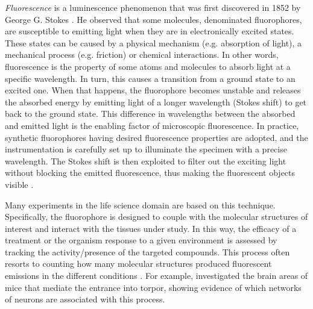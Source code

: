 \emph{Fluorescence} is a luminescence phenomenon that was first discovered in 1852 by George G. Stokes \cite{stokes2010memoir}. 
He observed that some molecules, denominated fluorophores, are susceptible to emitting light when they are in electronically excited states. These states can be caused by a physical mechanism (e.g. absorption of light), a mechanical process (e.g. friction) or chemical interactions.
In other words, fluorescence is the property of some atoms and molecules to absorb light at a specific wavelength. In turn, this causes a transition from a ground state to an excited one. When that happens, the fluorophore becomes unstable and releases the absorbed energy by emitting light of a longer wavelength (Stokes shift) to get back to the ground state.
This difference in wavelengths between the absorbed and emitted light is the enabling factor of microscopic fluorescence. 
In practice, synthetic fluorophores having desired fluorescence properties are adopted, and the 
instrumentation is carefully set up to illuminate the specimen with a precise wavelength. The Stokes shift is then exploited to filter out the exciting light without blocking the emitted fluorescence, thus making the fluorescent objects visible \cite{lichtman2005fluorescence}.

Many experiments in the life science domain are based on this technique.
Specifically, the fluorophore is designed to couple with the molecular structures of interest and interact with the tissues under study. 
In this way, the efficacy of a treatment or the organism response to a given environment is assessed by tracking the activity/presence of the targeted compounds. 
This process often resorts to counting how many molecular structures produced fluorescent emissions in the different conditions \cite{hitrec2019neural, hitrec2021reversible, da2020median}.
For example,  investigated the brain areas of mice that mediate the entrance into torpor, showing evidence of which networks of neurons are associated with this process.

